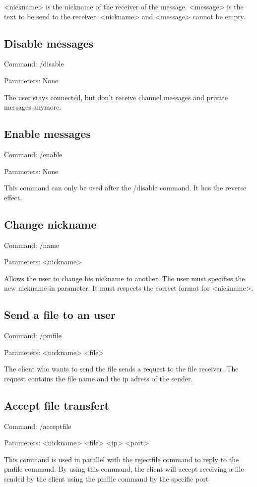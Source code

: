 \documentclass[12pt]{article}
\begin{document}
\begin{flushleft}
<nickname> is the nickname of the receiver of the message. <message> is the text to be send to the receiver. <nickname> and <message> cannot be empty.


    \subsection{Disable messages}
    
Command: /disable

Parameters: None

The user stays connected, but don’t receive channel messages and private messages anymore.

    \subsection{Enable messages}
Command: /enable

Parameters: None

This command can only be used after the /disable command. It has the reverse effect.

    \subsection{Change nickname}
Command: /name

Parameters: <nickname>

Allows the user to change his nickname to another. The user must specifies the new nickname in parameter. It must respects the correct format for <nickname>. 


    \subsection{Send a file to an user}
    
    
Command: /pmfile
   
Parameters: <nickname> <file>

The client who wants to send the file sends a request to the file receiver. The request contains the file name and the ip adress of the sender. 
    

    \subsection{Accept file transfert}
Command: /acceptfile 

Parameters: <nickname> <file> <ip> <port>

This command is used in parallel with the rejectfile command to reply to the pmfile command. By using this command, the client will accept receiving a file sended by the client using the pmfile command by the specific port


\end{flushleft}
\end{document}
